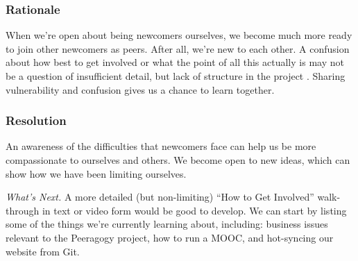 \subsubsection*{Rationale} 
When we're open about being newcomers ourselves, we become much more
ready to join other newcomers as peers.  After all, we're new to each other.  A
 confusion about how best to get involved
or what the point of all this actually is may not be a question of
insufficient detail, but lack of structure in the project
.  Sharing vulnerability and confusion gives us a chance to learn together.
%

\subsubsection*{Resolution}
An awareness of the difficulties that newcomers face can
help us be more compassionate to ourselves and others.  We
become open to new ideas, which can show how we have
been limiting ourselves.

\begin{framed}
\emph{What's Next.}
A more detailed (but non-limiting) ``How to Get Involved'' walk-through in text or video form would be good to develop. We can start by listing some of the things we're currently learning about, including: business issues relevant to the Peeragogy project, how to run a MOOC, and hot-syncing our website from Git.
\end{framed}


